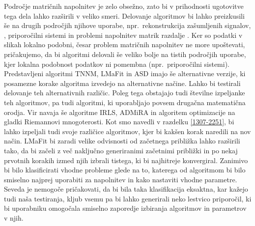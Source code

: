 Področje matričnih napolnitev je zelo obsežno, zato bi v prihodnosti ugotovitve tega dela lahko razširili v veliko smeri.
Delovanje algoritmov bi lahko preizkusili še na drugih področjih njihove uporabe, npr.\ rekonstrukcija zašumljenih signalov, , priporočilni sistemi in problemi napolnitev matrik razdalje \cite{Survey-NKS19}.
Ker so podatki v slikah lokalno podobni, česar problem matričnih napolnitev ne more upoštevati, pričakujemo, da bi algoritmi delovali še veliko bolje na tistih področjih uporabe, kjer lokalna podobnost podatkov ni pomembna (npr.\ priporočilni sistemi).
Predstavljeni algoritmi TNNM, LMaFit in ASD imajo še alternativne verzije, ki posamezne korake algoritma izvedejo na alternativne načine. Lahko bi testirali delovanje teh alternativnih različic. Poleg tega obstajajo tudi številne izpeljanke teh algoritmov,
pa tudi algoritmi, ki uporabljajo povsem drugačna matematična orodja. Vir \cite{Survey-NKS19} navaja še algoritme IRLS, ADMiRA in algoritem optimizacije na gladki Riemannovi mnogoterosti. Kot smo navedli v razdelku \ref{1307-2251}, bi lahko izpeljali tudi svoje različice algoritmov, kjer bi kakšen korak naredili na nov način. LMaFit bi zaradi velike odvisnosti od začetnega približka lahko razširili tako, da bi začeli z več naključno generiranimi začetnimi približki in po nekaj prvotnih korakih izmed njih izbrali tistega, ki bi najhitreje konvergiral. Zanimivo bi bilo klasificirati vhodne probleme glede na to, katerega od algoritmom bi bilo smiselno najprej uporabiti za napolnitev in kako nastaviti vhodne parametre. Seveda je nemogoče pričakovati, da bi bila taka klasifikacija eksaktna, kar kažejo tudi naša testiranja, kljub vsemu pa bi lahko generirali neko lestvico priporočil, ki bi uporabniku omogočala smiselno zaporedje izbiranja algoritmov in parametrov v njih.